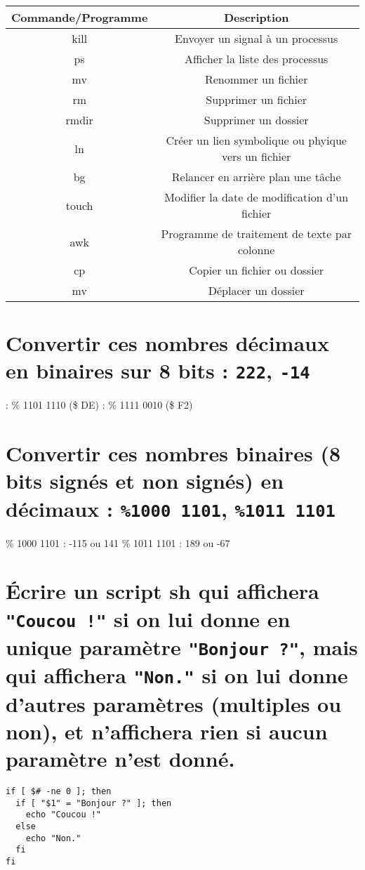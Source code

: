 \documentclass[11pt,a4paper]{article}
\begin{document}
\renewcommand\arraystretch{2.5}

\bigskip
\begin{center}
  \begin{tabular}{| c | c |}
  \hline
  \textbf{Commande/Programme} & \textbf{Description} \\ \hline
  kill & Envoyer un signal à un processus \\ \hline
  ps & Afficher la liste des processus \\ \hline
  mv & Renommer un fichier \\ \hline
  rm & Supprimer un fichier \\ \hline
  rmdir & Supprimer un dossier \\ \hline
  ln & Créer un lien symbolique ou phyique vers un fichier \\ \hline
  bg & Relancer en arrière plan une tâche \\ \hline
  touch & Modifier la date de modification d'un fichier \\ \hline
  awk & Programme de traitement de texte par colonne \\ \hline
  cp & Copier un fichier ou dossier \\ \hline
  mv & Déplacer un dossier \\
  \hline
  \end{tabular}
\end{center}
\bigskip

\renewcommand\arraystretch{1}

\section{Convertir ces nombres décimaux en binaires sur 8 bits : \texttt{222}, \texttt{-14}}

 : \% 1101 1110 (\$ DE)	 : \% 1111 0010 (\$ F2)
\bigskip

\section{Convertir ces nombres binaires (8 bits signés et non signés) en décimaux : \texttt{\%1000 1101}, \texttt{\%1011 1101}}

\bigskip
\% 1000 1101 : -115 ou 141	\qquad	\% 1011 1101 : 189 ou -67
\bigskip

\section{\'Ecrire un script sh qui affichera \texttt{"Coucou !"} si on lui donne en unique paramètre \texttt{"Bonjour ?"}, mais qui affichera \texttt{"Non."} si on lui donne d'autres paramètres (multiples ou non), et n'affichera rien si aucun paramètre n'est donné.}

\begin{verbatim}
if [ $# -ne 0 ]; then
  if [ "$1" = "Bonjour ?" ]; then
    echo "Coucou !"
  else
    echo "Non."
  fi
fi
\end{verbatim}
\end{document}
